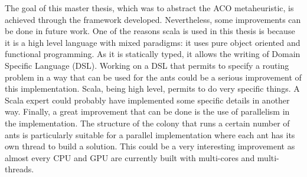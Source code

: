 The goal of this master thesis, which was to abstract the ACO metaheuristic, is achieved through the framework developed. Nevertheless, some improvements can be done in future work. One of the reasons scala is used in this thesis is because it is a high level language with mixed paradigms: it uses pure object oriented and functional programming. As it is statically typed, it allows the writing of Domain Specific Language (DSL). Working on a DSL that permits to specify a routing problem in a way that can be used for the ants could be a serious improvement of this implementation. Scala, being high level, permits to do very specific things. A Scala expert could probably have implemented some specific details in another way. Finally, a great improvement that can be done is the use of parallelism in the implementation. The structure of the colony that runs a certain number of ants is particularly suitable for a parallel implementation where each ant has its own thread to build a solution. This could be a very interesting improvement as almost every CPU and GPU are currently built with multi-cores and multi-threads.
